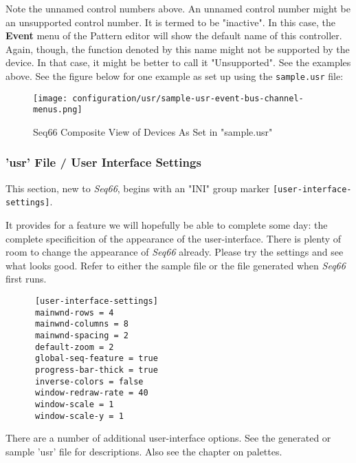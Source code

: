    Note the unnamed control numbers above.
   An unnamed control number might be an unsupported control number.
   It is termed to be "inactive".  In this case, the \textbf{Event} menu of
   the Pattern editor will show the default name of this controller.
   Again, though, the function denoted by this name might not be supported by
   the device.  In that case, it might be better to call it "Unsupported".
   See the examples above.  See the figure below for one example as set up using
   the \texttt{sample.usr} file:


\begin{figure}[H]
   \centering 
   \texttt{[image: configuration/usr/sample-usr-event-bus-channel-menus.png]}
   \caption{Seq66 Composite View of Devices As Set in "sample.usr"}
   \label{fig:sample_usr_event_bus_channel_menus}
\end{figure}

\subsubsection{'usr' File / User Interface Settings}
\label{subsubsec:usr_file_user_interface_settings}

   This section, new to \textsl{Seq66}, begins with an
   "INI" group marker \texttt{[user-interface-settings]}.

   It provides for a feature we will hopefully be able to complete some day:
   the complete specificition of the appearance of the user-interface.
   There is plenty of room to change the appearance of
   \textsl{Seq66} already.
   Please try the settings and see what looks good.
   Refer to either the sample file or the file generated when \textsl{Seq66}
   first runs.

   \begin{verbatim}
      [user-interface-settings]
      mainwnd-rows = 4
      mainwnd-columns = 8
      mainwnd-spacing = 2
      default-zoom = 2
      global-seq-feature = true
      progress-bar-thick = true
      inverse-colors = false
      window-redraw-rate = 40
      window-scale = 1
      window-scale-y = 1
   \end{verbatim}

   There are a number of additional user-interface options.  See the generated
   or sample 'usr' file for descriptions.  Also see the chapter on palettes.

